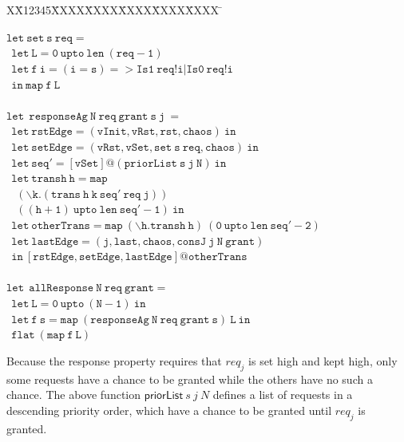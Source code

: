\documentclass[final]{IEEEtran}
\newlength{\fminilength}
\newenvironment{fmini}[1][\linewidth]
  {\setlength{\fminilength}{#1\fboxsep-2\fboxrule}%
   \vspace{2ex}\noindent\begin{lrbox}{\fminibox}\begin{minipage}{\fminilength}%
   \mbox{ }\hfill\vspace{-2.5ex}}%
  {\end{minipage}\end{lrbox}\vspace{1ex}\hspace{0ex}%
   \framebox{\usebox{\fminibox}}}
\newenvironment{specification}
{\noindent\footnotesize\tt\begin{fmini}\begin{tabbing}X\=X12345\=XXXX\=XXXX\=XXXX\=XXXX\=XXXX
\=\+\kill} {\end{tabbing}\normalfont\end{fmini}}
\begin{document}
\begin{table}
\begin{specification}


$\mathtt{ let\ set\ s\  req=}$\\
    $\ \ \mathtt{ let\ L =0\ upto\ len\ (req - 1)}$\\
     $\ \ \mathtt{ let\ f\  i=(i=s)=> Is1\ req!i |Is0\ req!i}$\\
     $\ \ \mathtt{in\ map\ f\ L}$\\
\\

$\mathtt{let\  \ responseAg\ N\ req\ grant\  s\ j\ =}$\\
 $\ \ \mathtt{  let\    rstEdge=(vInit,vRst,rst,chaos)\ in}$\\
 $\ \ \mathtt{  let\    setEdge=(vRst,vSet,set\ s\ req,chaos)\ in}$\\
$\ \   \mathtt{let\ seq'=[vSet]@(priorList\ s\ j\ N )\ in}$\\
$\ \   \mathtt{let\ transh\ h=map\ }$\\
$\ \  \ \  \mathtt{(\backslash k.(trans\  h\ k\  seq'\ req\ j))}$\\
$ \ \  \ \  \mathtt{((h+1)\ upto\ len\ seq'-1)\ in}$\\
$\ \   \mathtt{let\ otherTrans =map\ (\backslash h. transh\ h)\ (0\ upto\ len\ seq'-2)}$\\
$\ \   \mathtt{let\ lastEdge =(j, last, chaos, consJ\ j \ N\ grant)}$\\
    $\ \    \mathtt{in \ [rstEdge,setEdge,lastEdge]@otherTrans}$\\
    \\
    $\mathtt{let\  \ allResponse \     N\ req\ grant=}$\\
     $\ \ \mathtt{  let\    L=0\ upto\ (N -1)\ in}$\\
        $\ \ \mathtt{  let\    f\ s= map\ (responseAg\ N\ req\  grant\ s)\ L\ in}$\\
         $\ \ \mathtt{  flat\ (map\ f\ L)}$\\
\end{specification}
\end{table}
 Because the response property requires that $req_j$ is set high
and kept high, only some requests have a chance to be granted while
the others have no such a chance. The above function
$\mathsf{priorList}\ s\ j\ N$ defines a list of requests in a
descending priority order, which have a chance to be granted until
$req_j$ is granted.
\end{document}
